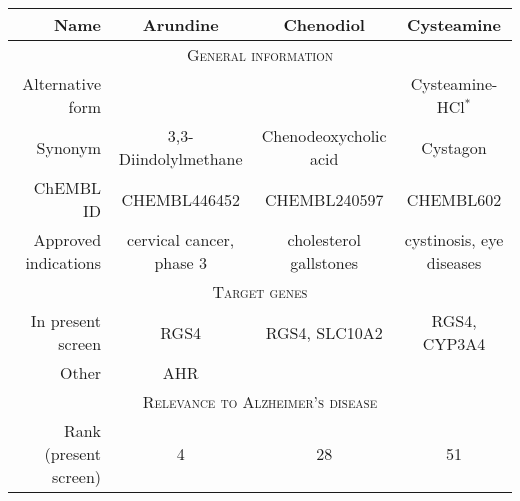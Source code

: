 \documentclass[letterpaper]{article}
\begin{document}
\begin{table}
\footnotesize
\begin{tabular}{r|c|c|c}
\toprule
                                              Name &                           Arundine &              Chenodiol &                          Cysteamine \\
\midrule
\multicolumn{4}{c}{\scshape General information} \\
\midrule
                                  Alternative form &
                                                   &                        & Cysteamine-HCl$^\ast$ \\
                                           Synonym &               3,3-Diindolylmethane &  Chenodeoxycholic acid &                            Cystagon \\
                                         ChEMBL ID &                       CHEMBL446452 &           CHEMBL240597 &                           CHEMBL602 \\
                              Approved indications &          cervical cancer, phase 3 & cholesterol gallstones &            cystinosis, eye diseases \\
\midrule
\multicolumn{4}{c}{\scshape Target genes} \\
\midrule
   In present screen &
   RGS4 &            RGS4, SLC10A2 &                         RGS4, CYP3A4 \\
                                             Other &                                AHR &                        &                                     \\
\midrule
\multicolumn{4}{c}{\scshape Relevance to Alzheimer's disease} \\
\midrule
                                             Rank (present screen)  &                                  4 &                     28 &                                  51 \\

\end{tabular}
\end{table}
\end{document}
